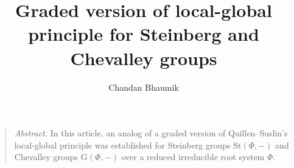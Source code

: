 \documentclass[11pt]{amsart}
\theoremstyle{definition}
\numberwithin{equation}{section}
\numberwithin{equation}{section}
\newcommand{\G}{\mathrm{G}}
\newcommand{\<}{\langle}
\renewcommand{\>}{\rangle}
\newcommand{\St}{\mathrm{St}}
\begin{document}
\title[Graded version of local global principle]{Graded version of local-global principle for Steinberg and Chevalley groups}
\author{Chandan Bhaumik}


\address{Department of Mathematics, Indian  Institute of Technology Bombay, Powai, Mumbai 400076, India}





\dedicatory{}
  





\maketitle
\vspace{-.7cm}

\begin{quote}\emph{Abstract.} 
In this article, an analog of a graded version of Quillen–Suslin’s local-global principle was established for Steinberg groups $\St(\Phi,-)$ and Chevalley groups $\G(\Phi,-)$ over a reduced irreducible root system $\Phi$.  
\end{quote}
\setcounter{tocdepth}{1} %


\end{document}
